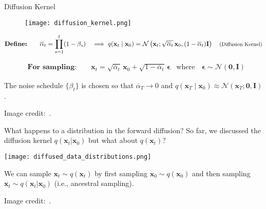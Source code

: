 \begin{refsection}
\begin{frame}{Diffusion Kernel}
  \begin{figure}
    \centering
    \texttt{[image: diffusion\_kernel.png]}
  \end{figure}

  \vspace{-2em}

  {\small
  \begin{flushleft}
  \begin{align*}
    &\textbf{Define:} \qquad \overline{\alpha}_t = \prod_{s=1}^t (1 - \beta_s)
    &\implies q(\mathbf{x}_t \mid \mathbf{x}_0) = \mathcal{N}\left(\mathbf{x}_t; \sqrt{\overline{\alpha}_t}\, \mathbf{x}_0, (1 - \overline{\alpha}_t)\mathbf{I}\right) \hspace{1em} \text{\footnotesize (Diffusion Kernel)}
  \end{align*}
  \end{flushleft}
  }
  \vspace{-1em}
  {\small
  \begin{flushleft}
  \begin{align*}
    &\textbf{For sampling:} \qquad \mathbf{x}_t = \sqrt{\overline{\alpha}_t}\, \mathbf{x}_0 + \sqrt{1 - \overline{\alpha}_t}\, \boldsymbol{\epsilon}
    &\text{where} \quad \boldsymbol{\epsilon} \sim \mathcal{N}(\mathbf{0}, \mathbf{I})
  \end{align*}
  \end{flushleft}
  }

  \begin{flushleft}
  \footnotesize
  The noise schedule $\{\beta_t\}$ is chosen so that $\overline{\alpha}_T \to 0$ and $q(\mathbf{x}_T \mid \mathbf{x}_0) \approx \mathcal{N}(\mathbf{x}_T; \mathbf{0}, \mathbf{I})$.
  \end{flushleft}

  \scriptsize Image credit:~\cite{CVPR2023Tutorial}.
  \bottomleftrefs
\end{frame}
\end{refsection}

\begin{refsection}
  \begin{frame}{What happens to a distribution in the forward diffusion?}
      So far, we discussed the diffusion kernel $q(\mathbf{x}_t|\mathbf{x}_0)$ but what about $q(\mathbf{x}_t)$?

      \vspace{1em}

        \centering
        \texttt{[image: diffused\_data\_distributions.png]}

  
      We can sample $\mathbf{x}_t \sim q(\mathbf{x}_t)$ by first sampling $\mathbf{x}_0 \sim q(\mathbf{x}_0)$ and then sampling $\mathbf{x}_t \sim q(\mathbf{x}_t|\mathbf{x}_0)$ (i.e., ancestral sampling).
     
      \scriptsize Image credit:~\cite{CVPR2023Tutorial}.
      \bottomleftrefs
  \end{frame}
  \end{refsection}


